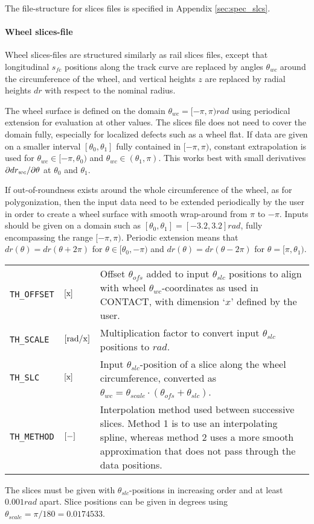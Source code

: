 \documentclass[12pt]{report}
\newenvironment{inputvars}{\vspace{0.4\baselineskip}%

\begin{tabular}{>{\raggedright}p{22mm}p{19mm}p{113mm}}}{
\end{tabular}

}
\newcommand{\inpvar}[3]{{\small\tt #1} & $#2$ & #3 \\[1ex]}
\begin{document}
The file-structure for slices files is specified in Appendix
\ref{sec:spec_slcs}.

\paragraph{Wheel slices-file}

Wheel slices-files are structured similarly as rail slices files, except
that longitudinal $s_{fc}$ positions along the track curve are replaced
by angles $\theta_{wc}$ around the circumference of the wheel, and
vertical heights $z$ are replaced by radial heights $dr$ with respect to
the nominal radius.

The wheel surface is defined on the domain $\theta_{wc}=[-\pi,\pi)
\unit{rad}$ using periodical extension for evaluation at other values. The
slices file does not need to cover the domain fully, especially for
localized defects such as a wheel flat.  If data are given on a smaller
interval $[\theta_0, \theta_1]$ fully contained in $[-\pi,\pi)$, constant
extrapolation is used for $\theta_{wc}\in [-\pi,\theta_0)$ and
$\theta_{wc}\in(\theta_1,\pi)$. This works best with small derivatives
$\partial dr_{wc}/\partial \theta$ at $\theta_0$ and $\theta_1$. 

If out-of-roundness exists around the whole circumference of the wheel,
as for polygonization, then the input data need to be extended periodically
by the user in order to create a wheel surface with smooth wrap-around
from $\pi$ to $-\pi$. Inputs should be given on a domain such as
$[\theta_0,\theta_1]=[-3.2,3.2] \unit{rad}$, fully encompassing the range
$[-\pi,\pi)$. Periodic extension means that $dr(\theta)=dr(\theta+2\pi)$ for
$\theta\in[\theta_0,-\pi)$ and $dr(\theta)=dr(\theta-2\pi)$ for
$\theta=[\pi,\theta_1)$.

\begin{inputvars}
\inpvar{TH\_OFFSET}{\bunit{x}}{Offset $\theta_{ofs}$ added to input 
        $\theta_{slc}$ positions to align with wheel 
        $\theta_{wc}$-coordinates as used in CONTACT, with dimension
        `$\unit{x}$' defined by the user.}
\inpvar{TH\_SCALE}{\bunit{rad/x}}{Multiplication factor to convert input
        $\theta_{slc}$ positions to $\unit{rad}$.}
\inpvar{TH\_SLC}{\bunit{x}}{Input $\theta_{slc}$-position of a slice along
        the wheel circumference, converted as $\theta_{wc} = \theta_{scale}
        \cdot (\theta_{ofs} + \theta_{slc})$.}
\inpvar{TH\_METHOD}{\bunit{-}}{Interpolation method used between successive
        slices. Method 1 is to use an interpolating spline, whereas method
        2 uses a more smooth approximation that does not pass through the
        data positions.}
\end{inputvars}
The slices must be given with $\theta_{slc}$-positions in increasing order
and at least $0.001\unit{rad}$ apart. Slice positions can be given in
degrees using $\theta_{scale}=\pi/180= 0.0174533$. 
\end{document}
